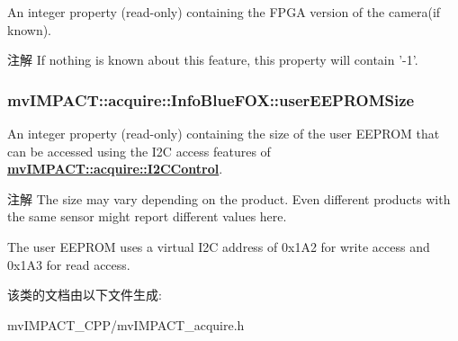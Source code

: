 An integer property {\bfseries }(read-\/only) containing the F\+P\+G\+A version of the camera(if known). 

\begin{DoxyNote}{注解}
If nothing is known about this feature, this property will contain '-\/1'. 
\end{DoxyNote}
\hypertarget{classmv_i_m_p_a_c_t_1_1acquire_1_1_info_blue_f_o_x_a57fce60a1a0f1890efd1b4515a2fced4}{
\subsubsection[{user\+E\+E\+P\+R\+O\+M\+Size}]{ mv\+I\+M\+P\+A\+C\+T\+::acquire\+::\+Info\+Blue\+F\+O\+X\+::user\+E\+E\+P\+R\+O\+M\+Size}}\label{classmv_i_m_p_a_c_t_1_1acquire_1_1_info_blue_f_o_x_a57fce60a1a0f1890efd1b4515a2fced4}


An integer property {\bfseries }(read-\/only) containing the size of the user E\+E\+P\+R\+O\+M that can be accessed using the I2\+C access features of {\bfseries \hyperlink{classmv_i_m_p_a_c_t_1_1acquire_1_1_i2_c_control}{mv\+I\+M\+P\+A\+C\+T\+::acquire\+::\+I2\+C\+Control}}. 

\begin{DoxyNote}{注解}
The size may vary depending on the product. Even different products with the same sensor might report different values here.

The user E\+E\+P\+R\+O\+M uses a virtual I2\+C address of 0x1\+A2 for write access and 0x1\+A3 for read access. 
\end{DoxyNote}


该类的文档由以下文件生成\+:\begin{DoxyCompactItemize}
\item 
mv\+I\+M\+P\+A\+C\+T\+\_\+\+C\+P\+P/mv\+I\+M\+P\+A\+C\+T\+\_\+acquire.\+h\end{DoxyCompactItemize}
